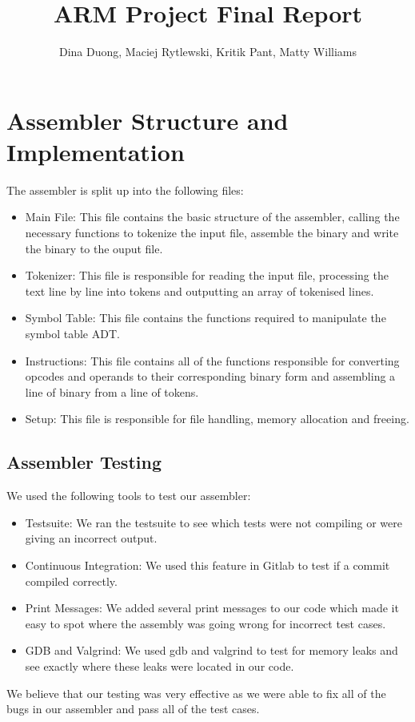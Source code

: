 \documentclass[11pt]{article}
\begin{document}
\title{
    \vspace{-2cm}
    ARM Project Final Report}
\author{Dina Duong, Maciej Rytlewski, Kritik Pant, Matty Williams}

\maketitle

\section{Assembler Structure and Implementation}
The assembler is split up into the following files:

\begin{itemize}
    \item Main File: This file contains the basic structure of the assembler, calling the necessary functions to tokenize the input file, assemble the binary and write the binary to the ouput file.
    \item Tokenizer: This file is responsible for reading the input file, processing the text line by line into tokens and outputting an array of tokenised lines.
    \item Symbol Table: This file contains the functions required to manipulate the symbol table ADT.
    \item Instructions: This file contains all of the functions responsible for converting opcodes and operands to their corresponding binary form and assembling a line of binary from a line of tokens.
    \item Setup: This file is responsible for file handling, memory allocation and freeing. 
\end{itemize}

\subsection{Assembler Testing}
We used the following tools to test our assembler:
\begin{itemize}
    \item Testsuite: We ran the testsuite to see which tests were not compiling or were giving an incorrect output.
    \item Continuous Integration: We used this feature in Gitlab to test if a commit compiled correctly.
    \item Print Messages: We added several print messages to our code which made it easy to spot where the assembly was going wrong for incorrect test cases. 
    \item GDB and Valgrind: We used gdb and valgrind to test for memory leaks and see exactly where these leaks were located in our code.
\end{itemize}
We believe that our testing was very effective as we were able to fix all of the bugs in our assembler and pass all of the test cases.
\end{document}
